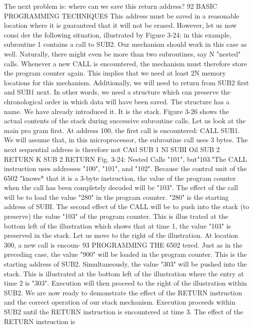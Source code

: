 The next problem is: where can we save this return address?
92
BASIC PROGRAMMING TECHNIQUES
This address must be saved in a reasonable location where it is
guaranteed that it will not be erased. However, let us now consi
der the following situation, illustrated by Figure 3-24: in this
example, subroutine 1 contains a call to SUB2. Our mechanism
should work in this case as well. Naturally, there might even be
more than two subroutines, say N "nested" calls. Whenever a
new CALL is encountered, the mechanism must therefore store
the program counter again. This implies that we need at least 2N
memory locations for this mechanism. Additionally, we will need
to return from SUB2 first and SUB1 next. In other words, we need
a structure which can preserve the chronological order in which
data will have been saved.
The structure has a name. We have already introduced it. It is
the stack. Figure 3-26 shows the actual contents of the stack
during successive subroutine calls. Let us look at the main pro
gram first. At address 100, the first call is encountered: CALL
SUB1. We will assume that, in this microprocessor, the subroutine
call uses 3 bytes. The next sequential address is therefore not
CAtl SUB 1
Nl
SUBI
Oil SUB 2
RETURN K
SUB 2
RETURN
Fig. 3-24: Nested Calls
"101", but"103."The CALL instruction uses addresses "100",
"101", and "102". Because the control unit of the 6502 "knows* that it
is a 3-byte instruction, the value of the program counter when the
call has been completely decoded will be "103". The effect of the
call will be to load the value "280" in the program counter. "280"
is the starting address of SUBI.
The second effect of the CALL will be to push into the stack (to
preserve) the value "103" of the program counter. This is illus
trated at the bottom left of the illustration which shows that at
time 1, the value "103" is preserved in the stack. Let us move to
the right of the illustration. At location 300, a new call is encoun-
93
PROGRAMMING THE 6502
tered. Just as in the preceding case, the value "900" will be
loaded in the program counter. This is the starting address of
SUB2. Simultaneously, the value "303" will be pushed into the
stack. This is illustrated at the bottom left of the illustration
where the entry at time 2 is "303". Execution will then proceed
to the right of the illustration within SUB2.
We are now ready to demonstrate the effect of the RETURN
instruction and the correct operation of our stack mechanism.
Execution proceeds within SUB2 until the RETURN instruction
is encountered at time 3. The effect of the RETURN instruction is
